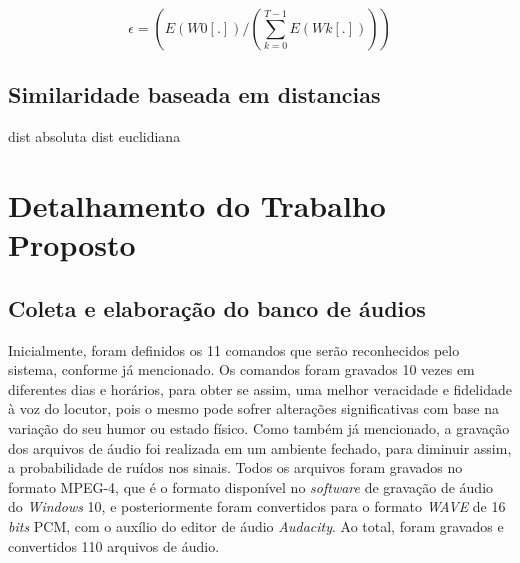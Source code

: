 \documentclass[a4paper,12pt,twoside,openright]{report}
\begin{document}
\begin{equation}
	\epsilon = (E(W0[.]) / (\sum_{k = 0}^{T-1}E(Wk[.])))
\end{equation}  
\section{Similaridade baseada em distancias}
\label{similaridade_baseada_em_distancias}
dist absoluta
dist euclidiana

\chapter{Detalhamento do Trabalho Proposto}
\label{cap3}
\thispagestyle{myheadings}
\vspace*{-0.3cm}
\section{Coleta e elabora{\c c}\~{a}o do banco de \'{a}udios}
\par Inicialmente, foram definidos os 11 comandos que ser\~{a}o reconhecidos pelo sistema, conforme j\'{a} mencionado. Os comandos foram gravados 10 vezes em diferentes dias e hor\'{a}rios, para obter se assim, uma melhor veracidade e fidelidade \`{a} voz do locutor, pois o mesmo pode sofrer altera{\c c}\~{o}es significativas com base na varia{\c c}\~{a}o do seu humor ou estado f\'{i}sico. Como tamb\'{e}m j\'{a} mencionado, a grava{\c c}\~{a}o dos arquivos de \'{a}udio foi realizada em um ambiente fechado, para diminuir assim, a probabilidade de ru\'{i}dos nos sinais. Todos os arquivos foram gravados no formato MPEG-4, que \'{e} o formato dispon\'{i}vel no \textit{software} de grava{\c c}\~{a}o de \'{a}udio do \textit{Windows} 10, e posteriormente foram convertidos para o formato \textit{WAVE} de 16 \textit{bits} PCM, com o aux\'{i}lio do editor de \'{a}udio \textit{Audacity}. Ao total, foram gravados e convertidos 110 arquivos de \'{a}udio.
\end{document}
